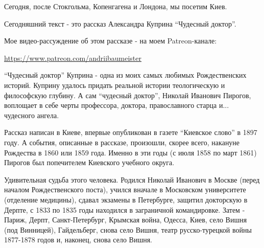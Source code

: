 \begin{multicols}{2} %
\setlength{\parindent}{0pt}

Сегодня, после Стокгольма, Копенгагена и Лондона, мы посетим Киев. 

Сегодняшний текст - это рассказ Александра Куприна \enquote{Чудесный доктор}. 

Мое видео-рассуждение об этом рассказе - на моем Patreon-канале:

\url{https://www.patreon.com/andriibaumeister} 

\enquote{Чудесный доктор} Куприна - одна из моих самых любимых Рождественских историй.
Куприну удалось придать реальной истории теологическую и философскую глубину. А
сам \enquote{чудесный доктор}, Николай Иванович Пирогов, воплощает в себе черты
профессора, доктора, православного старца и... чудесного ангела. 






\end{multicols} %

Рассказ написан в Киеве, впервые опубликован в газете \enquote{Киевское слово} в 1897
году. А события, описанные в рассказе, произошли, скорее всего, накануне
Рождества в 1860 или 1859 года. Именно в эти годы (с июля 1858 по март 1861)
Пирогов был попечителем Киевского учебного округа. 


Удивительная судьба этого человека. Родился Николай Иванович в Москве (перед
началом Рождественского поста), учился вначале в Московском университете
(отделение медицины), сдавал экзамены в Петербурге, защитил докторскую в
Дерпте, с 1833 по 1835 годы находился в заграничной командировке. Затем -
Париж, Дерпт, Санкт-Петербург, Крымская война, Одесса, Киев, село Вишня (под
Винницей), Гайдельберг, снова село Вишня, театр русско-турецкой войны 1877-1878
годов и, наконец, снова село Вишня. 

